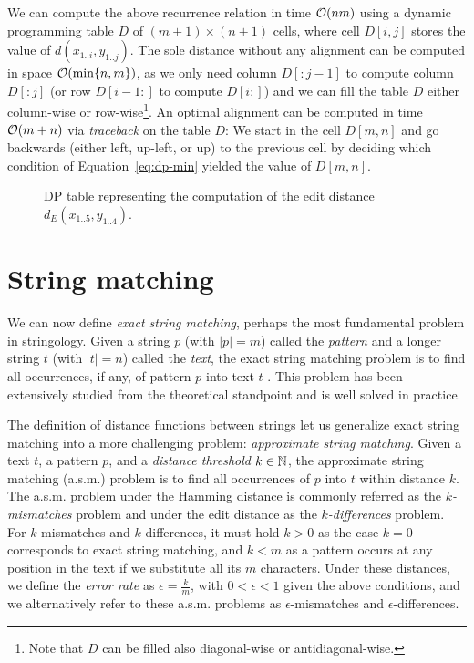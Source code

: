 We can compute the above recurrence relation in time $\mathcal{O}(nm)$ using a dynamic programming table $D$ of $(m+1) \times (n+1)$ cells, where cell $D[i,j]$ stores the value of $d(x_{1..i},y_{1..j})$.
The sole distance without any alignment can be computed in space $\mathcal{O}(\text{min}\{ n, m \})$, as we only need column $D[:j-1]$ to compute column $D[:j]$ (or row $D[i-1:]$ to compute $D[i:]$) and we can fill the table $D$ either column-wise or row-wise\footnote{Note that $D$ can be filled also diagonal-wise or antidiagonal-wise.}.
An optimal alignment can be computed in time $\mathcal{O}(m + n)$ via \emph{traceback} on the table $D$:
We start in the cell $D[m,n]$ and go backwards (either left, up-left, or up) to the previous cell by deciding which condition of Equation~\ref{eq:dp-min} yielded the value of $D[m,n]$.

\begin{figure}[h]
\begin{center}
\caption[Example of DP table.]{DP table representing the computation of the edit distance $d_E(x_{1..5}, y_{1..4})$.}
\label{fig:edit-dp}

\end{center}
\end{figure}



\section{String matching}


We can now define \emph{exact string matching}, perhaps the most fundamental problem in stringology.
Given a string $p$ (with $|p|=m$) called the \emph{pattern} and a longer string $t$ (with $|t|=n$) called the \emph{text}, the exact string matching problem is to find all occurrences, if any, of pattern $p$ into text $t$ \citep{Gusfield1997}.
This problem has been extensively studied from the theoretical standpoint and is well solved in practice.

The definition of distance functions between strings let us generalize exact string matching into a more challenging problem: \emph{approximate string matching}.
Given a text $t$, a pattern $p$, and a \emph{distance threshold} $k \in \mathbb {N}$, the approximate string matching (a.s.m.) problem is to find all occurrences of $p$ into $t$ within distance $k$.
The a.s.m. problem under the Hamming distance is commonly referred as the \emph{$k$-mismatches} problem and under the edit distance as the \emph{$k$-differences} problem.
For $k$-mismatches and $k$-differences, it must hold $k > 0$ as the case $k = 0$ corresponds to exact string matching, and $k < m$ as a pattern occurs at any position in the text if we substitute all its $m$ characters.
Under these distances, we define the \emph{error rate} as $\epsilon = \frac{k}{m}$, with $0 < \epsilon < 1$ given the above conditions, and we alternatively refer to these a.s.m. problems as $\epsilon$-mismatches and $\epsilon$-differences.

